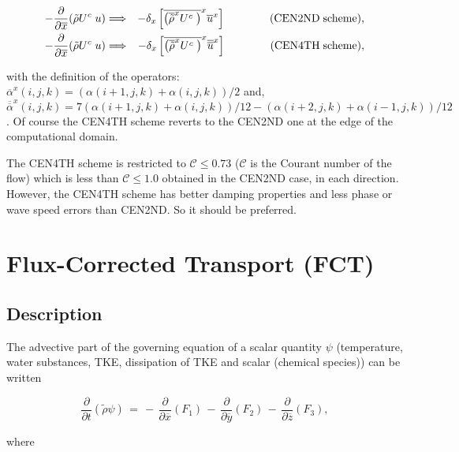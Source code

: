 \begin{eqnarray}
\label{diffm}
- \frac{\displaystyle\partial }{\displaystyle\partial \overline{x}} (\tilde{\rho} U^{c} \;   u )
 & \Longrightarrow & - \delta_{x} \left[
\overline{  \left(
\overline{\tilde{\rho}}^{x} U^{c} \;  \right)}^{x}
\overline{  u  }^{x}
 \right] \qquad \qquad {\rm (CEN2ND \; scheme)}, \\
- \frac{\displaystyle\partial }{\displaystyle\partial \overline{x}} (\tilde{\rho} U^{c} \;   u )
 & \Longrightarrow & - \delta_{x} \left[
\overline{  \left(
\overline{\tilde{\rho}}^{x} U^{c} \;  \right)}^{x}
\overline{\overline{  u  }}^{x} 
 \right] \qquad \qquad {\rm (CEN4TH \; scheme)},
\end{eqnarray}

with the definition of the operators:
$\overline{\alpha}^{x}(i,j,k)=(\alpha(i+1,j,k)+\alpha(i,j,k))/2$
and,
$\overline{\overline{\alpha}}^{x}(i,j,k)=7(\alpha(i+1,j,k)+\alpha(i,j,k))/12-(\alpha(i+2,j,k)+\alpha(i-1,j,k))/12$. Of course the CEN4TH scheme reverts to the CEN2ND one at the edge of the computational domain.

The CEN4TH scheme is restricted to $\mathcal{C}\leq0.73$ ($\mathcal{C}$ is the Courant number of the flow) which is less than $\mathcal{C}\leq1.0$ obtained in the CEN2ND case, in each direction. However, the CEN4TH scheme has better damping properties and less phase or wave speed errors than CEN2ND. So it should be preferred.

\section{Flux-Corrected Transport (FCT)}

\subsection{Description}

The advective part of the governing equation of a scalar quantity $\psi$
(temperature, water substances, TKE, dissipation of TKE and scalar (chemical species))
can be written

\begin{equation}
\label{cond1}
\dfrac{\partial}{\partial t}(\tilde{\rho}\psi) \, =
 \, - \, \dfrac{\partial }{\partial \overline{x}} (F_1)
 \, - \, \dfrac{\partial }{\partial \overline{y}} (F_2)
 \, - \, \dfrac{\partial }{\partial \overline{z}} (F_3),
\end{equation}

\noindent where

